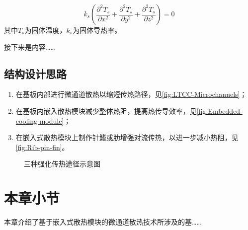 \begin{equation}
    k_{s}\left(\frac{\partial^{2} T_{s}}{\partial x^{2}}+\frac{\partial^{2} T_{s}}{\partial y^{2}}+\frac{\partial^{2} T_{s}}{\partial z^{2}}\right)=0
\end{equation}
其中$T_{s}$为固体温度，$k_{s}$为固体导热率。

接下来是内容……

\subsection{结构设计思路}

\begin{enumerate}
    \item 在基板内部进行微通道散热以缩短传热路径，见\cref{fig:LTCC-Microchannels}；
    \item 在基板内嵌入散热模块减少整体热阻，提高热传导效率，见\cref{fig:Embedded-cooling-module}；
    \item 在嵌入式散热模块上制作针鳍或肋增强对流传热，以进一步减小热阻，见\cref{fig:Rib-pin-fin}。
\end{enumerate}

\begin{figure}[htb]

    \caption{三种强化传热途径示意图}
    \label{fig:Three-enhanced-heat-transfer-paths}
\end{figure}

\section{本章小节}
本章介绍了基于嵌入式散热模块的微通道散热技术所涉及的基……